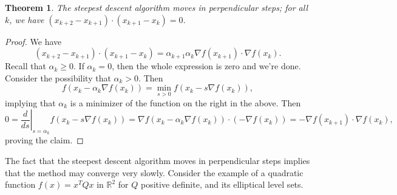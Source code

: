 \documentclass[11pt]{article}
\newcommand{\R}{\mathbb{R}}
\newtheorem{theorem}{Theorem}[section]
\begin{document}
\begin{theorem}
The steepest descent algorithm moves in perpendicular steps; for all $k$, we have $(x_{k+2} - x_{k+1})\cdot(x_{k+1} - x_k) = 0$.
\end{theorem}
\begin{proof}
We have
\[
(x_{k+2} - x_{k+1})\cdot(x_{k+1} - x_k) = \alpha_{k+1}\alpha_k \nabla f(x_{k+1}) \cdot \nabla f(x_k).
\]
Recall that $\alpha_k \geq 0$. If $\alpha_k = 0$, then the whole expression is zero and we're done. Consider the possibility that $\alpha_k > 0$. Then
\[
f(x_k - \alpha_k \nabla f(x_k)) = \min_{s > 0} f(x_k - s \nabla f(x_k)),
\]
implying that $\alpha_k$ is a minimizer of the function on the right in the above. Then
\[
0 = \left. \frac{d}{ds} \right|_{s=\alpha_k} f(x_k - s\nabla f(x_k)) = \nabla f(x_k - \alpha_k \nabla f(x_k)) \cdot (-\nabla f(x_k)) = -\nabla f(x_{k+1}) \cdot \nabla f(x_k),
\]
proving the claim.
\end{proof}

The fact that the steepest descent algorithm moves in perpendicular steps implies that the method may converge very slowly. Consider the example of a quadratic function $f(x) = x^TQx$ in $\R^2$ for $Q$ positive definite, and its elliptical level sets. 
\end{document}
